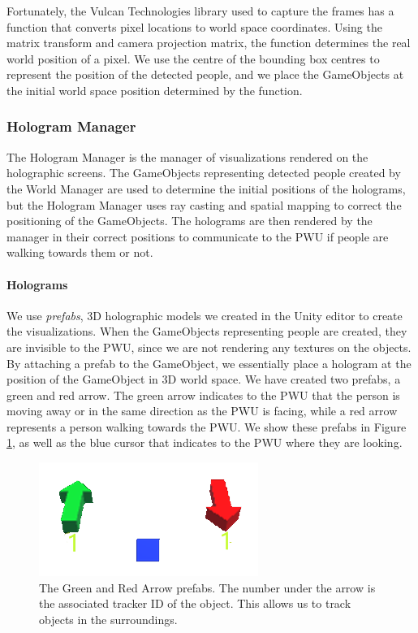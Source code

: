 Fortunately, the Vulcan Technologies library used to capture the frames has a function that converts pixel locations to world space coordinates. Using the  matrix transform and camera projection matrix, the  function determines the real world position of a pixel. We use the centre of the bounding box centres to represent the position of the detected people, and we place the GameObjects at the initial world space position determined by the function.

\subsubsection{Hologram Manager}
The Hologram Manager is the manager of visualizations rendered on the holographic screens. The GameObjects representing detected people created by the World Manager are used to determine the initial positions of the holograms, but the Hologram Manager uses ray casting and spatial mapping to correct the positioning of the GameObjects. The holograms are then rendered by the manager in their correct positions to communicate to the PWU if people are walking towards them or not.

\paragraph{Holograms} We use \textit{prefabs}, 3D holographic models we created in the Unity editor to create the visualizations. When the GameObjects representing people are created, they are invisible to the PWU, since we are not rendering any textures on the objects. By attaching a prefab to the GameObject, we essentially place a hologram at the position of the GameObject in 3D world space. We have created two prefabs, a green and red arrow. The green arrow indicates to the PWU that the person is moving away or in the same direction as the PWU is facing, while a red arrow represents a person walking towards the PWU. We show these prefabs in Figure \ref{fig:holograms}, as well as the blue cursor that indicates to the PWU where they are looking.

\begin{figure}[ht]
    \centering
    \includegraphics[width=0.5\linewidth]{img/chapter5_implementation/greenredholowhite.png}
    \caption{The Green and Red Arrow prefabs. The number under the arrow is the associated tracker ID of the object. This allows us to track objects in the surroundings.}
    \label{fig:holograms}
\end{figure}

